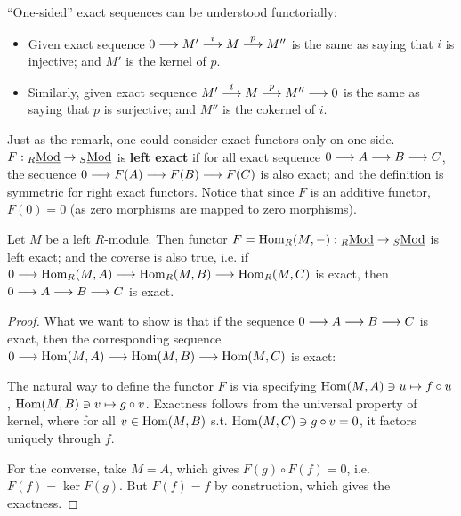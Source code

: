 \documentclass{article}
\begin{document}
\begin{remark}
    ``One-sided'' exact sequences can be understood functorially:
    \begin{itemize}
        \item Given exact sequence $0 \longrightarrow M' \overset{i}{\longrightarrow} M \overset{p}{\longrightarrow} M''$ is the same as saying that $i$ is injective; and $M'$ is the kernel of $p$.
        \item Similarly, given exact sequence $M' \overset{i}{\longrightarrow} M \overset{p}{\longrightarrow} M'' \longrightarrow 0$ is the same as saying that $p$ is surjective; and $M''$ is the cokernel of $i$.
    \end{itemize}
\end{remark}

\begin{definition}
    Just as the remark, one could consider exact functors only on one side. $F: {}_{R}\underline{\textup{Mod}} \to {}_{S}\underline{\textup{Mod}}$ is \textbf{left exact} if for all exact sequence $0 \longrightarrow A \longrightarrow B \longrightarrow C$, the sequence $0 \longrightarrow F(A) \longrightarrow F(B) \longrightarrow F(C)$ is also exact; and the definition is symmetric for right exact functors. Notice that since $F$ is an additive functor, $F(0) = 0$ (as zero morphisms are mapped to zero morphisms). 
\end{definition}

\begin{proposition}\label{prop:Hom(M,-) left exact}
    Let $M$ be a left $R$-module. Then functor $F = \mathrm{Hom}_R(M, -): {}_{R}\underline{\textup{Mod}} \to {}_{S}\underline{\textup{Mod}}$ is left exact; and the coverse is also true, i.e. if $0 \longrightarrow \mathrm{Hom}_R(M, A) \longrightarrow \mathrm{Hom}_R(M, B) \longrightarrow \mathrm{Hom}_R(M, C)$ is exact, then $0 \longrightarrow A \longrightarrow B \longrightarrow C$ is exact.
\end{proposition}

\begin{proof}
    What we want to show is that if the sequence $0 \longrightarrow A \longrightarrow B \longrightarrow C$ is exact, then the corresponding sequence $0 \longrightarrow \mathrm{Hom}(M, A) \longrightarrow \mathrm{Hom}(M, B) \longrightarrow \mathrm{Hom}(M, C)$ is exact:
    \begin{figure}[htbp]
        \centering
    \end{figure}
    The natural way to define the functor $F$ is via specifying $\mathrm{Hom}(M, A) \ni u \mapsto f \circ u$, $\mathrm{Hom}(M, B) \ni v \mapsto g \circ v$. Exactness follows from the universal property of kernel, where for all $v \in \mathrm{Hom}(M, B)$ s.t. $\mathrm{Hom}(M, C) \ni g \circ v = 0$, it factors uniquely through $f$. 

    For the converse, take $M = A$, which gives $F(g) \circ F(f) = 0$, i.e. $F(f) = \ker F(g)$. But $F(f) = f$ by construction, which gives the exactness.  
\end{proof}
\end{document}

